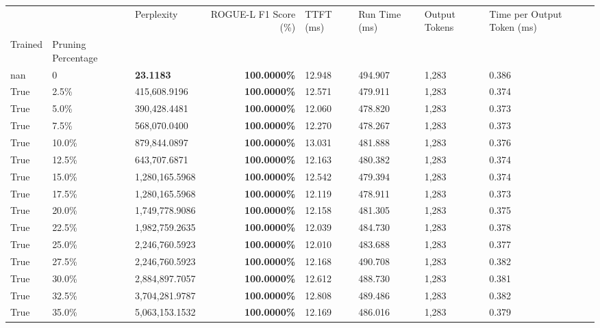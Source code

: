 \begin{table}[H]
\label{tab:evaluation-pipeline-13-trained}
\begin{tabular}{lllrllll}
\toprule
 &  & Perplexity & ROGUE-L F1 Score (\%) & TTFT (ms) & Run Time (ms) & Output Tokens & Time per Output Token (ms) \\
Trained & Pruning Percentage &  &  &  &  &  &  \\
\midrule
nan & 0 & \bfseries 23.1183 & \bfseries 100.0000\% & 12.948 & 494.907 & 1,283 & 0.386 \\
\cline{1-8}
True & 2.5\% & 415,608.9196 & \bfseries \color{red} 100.0000\% & 12.571 & 479.911 & 1,283 & 0.374 \\
\cline{1-8}
True & 5.0\% & 390,428.4481 & \bfseries \color{red} 100.0000\% & 12.060 & 478.820 & 1,283 & 0.373 \\
\cline{1-8}
True & 7.5\% & 568,070.0400 & \bfseries \color{red} 100.0000\% & 12.270 & 478.267 & 1,283 & 0.373 \\
\cline{1-8}
True & 10.0\% & 879,844.0897 & \bfseries \color{red} 100.0000\% & 13.031 & 481.888 & 1,283 & 0.376 \\
\cline{1-8}
True & 12.5\% & 643,707.6871 & \bfseries \color{red} 100.0000\% & 12.163 & 480.382 & 1,283 & 0.374 \\
\cline{1-8}
True & 15.0\% & 1,280,165.5968 & \bfseries \color{red} 100.0000\% & 12.542 & 479.394 & 1,283 & 0.374 \\
\cline{1-8}
True & 17.5\% & 1,280,165.5968 & \bfseries \color{red} 100.0000\% & 12.119 & 478.911 & 1,283 & 0.373 \\
\cline{1-8}
True & 20.0\% & 1,749,778.9086 & \bfseries \color{red} 100.0000\% & 12.158 & 481.305 & 1,283 & 0.375 \\
\cline{1-8}
True & 22.5\% & 1,982,759.2635 & \bfseries \color{red} 100.0000\% & 12.039 & 484.730 & 1,283 & 0.378 \\
\cline{1-8}
True & 25.0\% & 2,246,760.5923 & \bfseries \color{red} 100.0000\% & 12.010 & 483.688 & 1,283 & 0.377 \\
\cline{1-8}
True & 27.5\% & 2,246,760.5923 & \bfseries \color{red} 100.0000\% & 12.168 & 490.708 & 1,283 & 0.382 \\
\cline{1-8}
True & 30.0\% & 2,884,897.7057 & \bfseries \color{red} 100.0000\% & 12.612 & 488.730 & 1,283 & 0.381 \\
\cline{1-8}
True & 32.5\% & 3,704,281.9787 & \bfseries \color{red} 100.0000\% & 12.808 & 489.486 & 1,283 & 0.382 \\
\cline{1-8}
True & 35.0\% & 5,063,153.1532 & \bfseries \color{red} 100.0000\% & 12.169 & 486.016 & 1,283 & 0.379 \\

\end{tabular}
\end{table}
